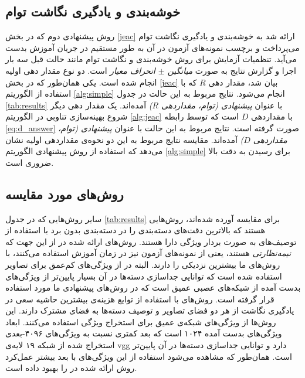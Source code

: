 \subsection{ خوشه‌بندی و یادگیری نگاشت توام}\label{exp:jeac}
روش پیشنهادی دوم که در بخش \ref{jeac} ارائه شد به خوشه‌بندی و یادگیری نگاشت توام می‌پرداخت و برچسب نمونه‌های آزمون در آن به طور مستقیم در جریان آموزش بدست می‌آید.
تنظمیات آزمایش برای روش خوشه‌بندی و نگاشت توام مانند حالت قبل سه بار اجرا و گزارش نتایج به صورت \textit{ میانگین $\pm$ انحراف معیار } است. دو نوع  مقدار دهی اولیه انجام شده است. یکی همان‌طور که در بخش \ref{jeac} بیان شد، مقدار دهی $R$ که با استفاده از الگوریتم
\ref{alg:simple}
انجام می‌شود. نتایج مربوط به این حالت در جدول  \ref{tab:results} با عنوان
\textit{ پیشنهادی (توام، مقداردهی $R$)}
آمده‌اند. یک مقدار دهی دیگر شروع بهینه‌سازی تناوبی در الگوریتم
\ref{alg:jeac}
 با مقداردهی $D$ است که توسط رابطه
\eqref{eq:d_answer}
صورت گرفته است. نتایج مربوط به این حالت با عنوان
\textit{پیشنهادی (توام، مقداردهی $D$)}
آمده‌اند. مقایسه نتایج مربوط به این دو نحوه‌ی مقداردهی اولیه نشان می‌دهد که استفاده از روش پیشنهادی الگوریتم \ref{alg:simple}  برای رسیدن به دقت بالا ضروری است.

\subsection{روش‌های مورد مقایسه}\label{exp:other_methods}
سایر روش‌هایی که در جدول  \ref{tab:results} برای مقایسه آورده شده‌اند، روش‌هایی هستند که بالاترین دقت‌های دسته‌بندی را در دسته‌بندی بدون برد با استفاده از توصیف‌های به صورت بردار ویژگی دارا هستند.
روش‌های ارائه شده در 
\cite{li15max, semi15, Kodirov2015}
از این جهت که \textit{نیمه‌نظارتی} هستند، یعنی از  نمونه‌های آزمون نیز در زمان آموزش استفاده می‌کنند، با روش‌های ما بیشترین نزدیکی را دارند. البته در 
\cite{li15max, semi15}
از ویژگی‌های کم‌عمق برای تصاویر استفاده شده است که توانایی جداسازی دسته‌ها در آن بسیار پایین‌تر از ویژگی‌های بدست آمده از شبکه‌های عصبی عمیق است که در روش‌های پیشنهادی ما مورد استفاده قرار گرفته است. روش‌های 
\cite{Akata2015, Xian2016}
با استفاده از توابع هزینه‌ی بیشترین حاشیه سعی در یادگیری نگاشت از هر دو فضای تصاویر و توصیف دسته‌ها به فضای مشترک دارند. این روش‌ها از ویژگی‌های شبکه‌ی عمیق 
 \cite{googlenet}
 برای استخراج ویژگی استفاده می‌کنند. ابعاد ویژگی‌های بدست آمده ۱۰۲۴ است که بعد کمتری نسبت به ویژگی‌های ۴۰۹۶-بعدی استخراج شده از شبکه ۱۹ لایه‌ی vgg دارد و توانایی جداسازی دسته‌ها در آن پایین‌تر است. همان‌طور که مشاهده می‌شود استفاده از این ویژگی‌های با بعد بیشتر عمل‌کرد روش ارائه شده در \cite{Akata2015} را بهبود داده است.
 

